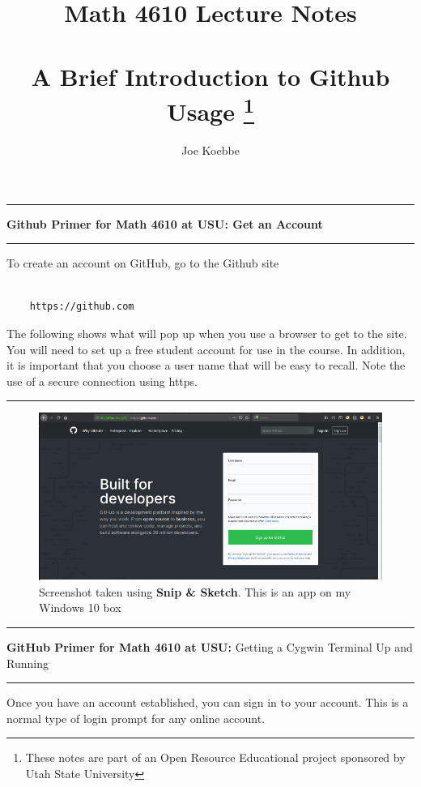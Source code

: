 \documentclass[10pt,fleqn]{article}
\title{Math 4610 Lecture Notes \\
            \ \\
       A Brief Introduction to Github Usage
  \footnote{These notes are part of an Open Resource Educational project
            sponsored by Utah State University}}
\author{Joe Koebbe}
\begin{document}
\maketitle
\newpage

\vskip0.1in\hrule\vskip0.1in
\noindent
{\bf Github Primer for Math 4610 at USU: Get an Account} 
\vskip0.1in\hrule\vskip0.1in
\noindent
To create an account on GitHub, go to the Github site
\begin{verbatim}

    https://github.com

\end{verbatim}
The following shows what will pop up when you use a browser to get to the site.
You will need to set up a free student account for use in the course. In
addition, it is important that you choose a user name that will be easy to
recall. Note the use of a secure connection using https.
\vskip0.1in\hrule\vskip0.1in
\vfill
\begin{figure}[h]
\centering
\includegraphics{../images/github_01.png}
\vskip0.1in
\caption{{Screenshot} taken using {\bf Snip \& Sketch}. This is an app on
         my Windows 10 box}
\end{figure}
\eject
\vskip0.1in\hrule\vskip0.1in
\noindent
{{\bf GitHub Primer for Math 4610 at USU:} Getting a Cygwin Terminal Up and
   Running} 
\vskip0.1in\hrule\vskip0.1in
\noindent
Once you have an account established, you can sign in to your account. This is
a normal type of login prompt for any online account.
\end{document}
